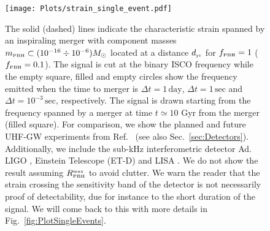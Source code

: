 \documentclass[11pt,a4paper]{article}
\newcommand{\PBH}{\text{\tiny PBH}}
\begin{document}
\begin{figure}[t!]
\centering
\texttt{[image: Plots/strain\_single\_event.pdf]}
\caption{
The solid (dashed) lines indicate the characteristic strain spanned by an inspiraling merger with component masses $m_\text{\tiny PBH}\subset(10^{-16}\div 10^{-6})M_\odot$ 
located at a distance $d_\text{\tiny yr}$ for $f_\text{\tiny PBH} = 1$ ($f_\text{\tiny PBH} = 0.1$). 
The signal is cut at the binary ISCO frequency while the empty square, filled and empty circles show the frequency emitted when 
the time to merger is $\Delta t = 1\, \text{day}$,  $\Delta t = 1\, \text{sec}$ and  $\Delta t = 10^{-3}\, \text{sec}$, respectively. 
The signal is drawn starting from the frequency spanned by a merger at time $t\simeq 10$ Gyr from the merger (filled square). 
For comparison, we show the planned and future UHF-GW experiments from Ref.~\cite{Aggarwal:2020olq} (see also Sec.~\ref{sec:Detectors}).
Additionally, we include the sub-kHz interferometric detector 
Ad. LIGO \cite{Harry_2010}, Einstein Telescope (ET-D) \cite{Hild:2010id} and LISA \cite{Robson:2018ifk}.
We do not show the result assuming $R_\PBH^\text{\tiny max}$ to avoid clutter. 
We warn the reader that the strain crossing the sensitivity band of the detector is not necessarily proof of detectability, due for instance to the short duration of the signal. We will come back to this with more details in Fig.~\ref{fig:PlotSingleEvents}. 
%
}\label{fig: PBH hc single}
\end{figure}
\end{document}
